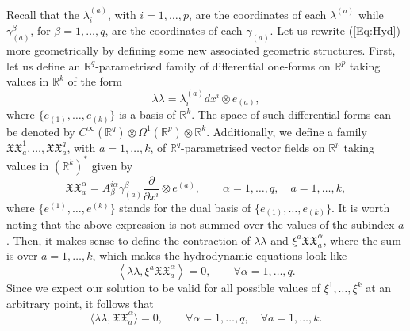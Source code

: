 \documentclass{birkjour}
\theoremstyle{definition}
\theoremstyle{remark}
\numberwithin{equation}{section}
\numberwithin{equation}{section}
\numberwithin{thm}{section}
\numberwithin{equation}{section}
\numberwithin{thm}{section}
\begin{document}
Recall that the $\lambda_i^{(a)}$, with $i=1,\ldots,p$, are the coordinates of each $\lambda^{(a)}$ while $\gamma_{(a)}^\beta$, for $\beta=1,\ldots,q$, are the coordinates of each $\gamma_{(a)}$. Let us rewrite (\ref{Eq:Hyd}) more geometrically by defining some new associated geometric structures. First, let us define an $\mathbb{R}^q$-parametrised family of differential one-forms on $\mathbb{R}^p$ taking values in $\mathbb{R}^k$ of the form
\begin{equation}%
	\lambda\!\!\!\!\lambda=%
	\lambda^{(a)}_idx^i\otimes e_{(a)},
\end{equation}
where $\{e_{(1)},\ldots,e_{(k)}\}$ is a basis of $\mathbb{R}^k$. The space of such differential forms can be denoted by $C^\infty(\mathbb{R}^q)\otimes \Omega^1(\mathbb{R}^p)\otimes \mathbb{R}^k$. 
Additionally, we define a family $ \mathfrak{X}\!\!\!\!\mathfrak{X}_a^1,\ldots,\mathfrak{X}\!\!\!\!\mathfrak{X}_a^q$, with $a=1,\ldots,k$, of $\mathbb{R}^q$-parametrised vector fields on $\mathbb{R}^p$ taking values in $(\mathbb{R}^{k})^*$ given by
\begin{equation}\label{Eq:Xaa}
	\mathfrak{X}\!\!\!\!\mathfrak{X}_a^\alpha=%
	A^{i\alpha}_\beta\gamma_{(a)}^\beta \frac{\partial}{\partial x^i}\otimes e^{(a)},\qquad \alpha=1,\ldots,q,\quad a=1,\ldots,k,
\end{equation}
where $\{e^{(1)},\ldots,e^{(k)}\}$ stands for the dual basis of $\{e_{(1)},\ldots,e_{(k)}\}$. It is worth noting that the above expression is not summed over the values of the subindex $a$.
Then, it makes sense to define the contraction of $\lambda\!\!\!\lambda$ and $\xi^a\mathfrak{X}\!\!\!\!\mathfrak{X}_a^\alpha$, where the sum is over $a=1,\ldots,k$, which makes the hydrodynamic equations  look like 
\begin{equation}\label{Eq:contrac}
	\left\langle \lambda\!\!\!\!\lambda,%
	\xi^a\mathfrak{X}\!\!\!\!\mathfrak{X}_a^\alpha\right\rangle=0,\qquad \forall \alpha=1,\ldots,q.
\end{equation}
Since we expect our solution to be valid for all possible values of $\xi^1,\ldots,\xi^k$ at an arbitrary point, it follows that
\begin{equation}\label{Eq:Hydro}
	\langle \lambda\!\!\!\!\lambda,\mathfrak{X}\!\!\!\!\mathfrak{X}_a^\alpha\rangle=0,\qquad \forall \alpha=1,\ldots,q,\quad \forall a=1,\ldots,k.
\end{equation}
\end{document}
